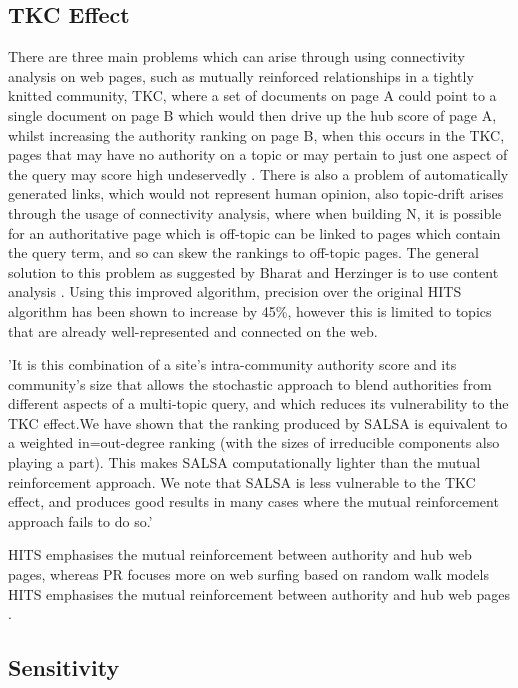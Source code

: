 \documentclass[11pt]{report}
\begin{document}
{\subsection{TKC Effect}
There are three main problems which can arise through using connectivity analysis on web pages, such as mutually reinforced relationships in a tightly knitted community, TKC, where a set of documents on page A could point to a single document on page B which would then drive up the hub score of page A, whilst increasing the authority ranking on page B, when this occurs in the TKC, pages that may have no authority on a topic or may pertain to just one aspect of the query may score high undeservedly \cite{lempel2000stochastic}. There is also a problem of automatically generated links, which would not represent human opinion, also topic-drift arises through the usage of connectivity analysis, where when building N, it is possible for an authoritative page which is off-topic can be linked to pages which contain the query term, and so can skew the rankings to off-topic pages. The general solution to this problem as suggested by Bharat and Herzinger is to use content analysis \cite{bharat1998improved}. Using this improved algorithm, precision over the original HITS algorithm has been shown to increase by 45\%, however this is limited to topics that are already well-represented and connected on the web. 

'It is this combination of a site’s intra-community authority score and its community’s size that allows the stochastic approach to blend authorities from different aspects of a multi-topic query, and which reduces its vulnerability to the TKC effect.We have shown that the ranking produced by SALSA is equivalent to a weighted in=out-degree ranking (with the sizes of irreducible components also playing a part). This makes SALSA computationally lighter than the mutual reinforcement approach. We note that SALSA is less vulnerable to the TKC effect, and produces good results in many cases where the mutual reinforcement approach fails to do so.\cite{lempel2000stochastic}'

HITS emphasises the mutual reinforcement between authority and hub web pages, whereas PR focuses more on web surfing based on random walk models HITS emphasises the mutual reinforcement between authority and hub web pages \cite{ding2003pagerank}.

\subsection{Sensitivity}

}
\end{document}
